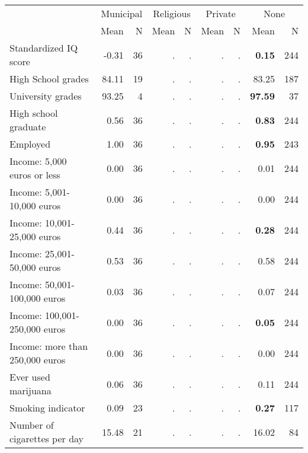 \begin{tabular}{l r r r r r r r r}
\toprule
& \multicolumn{2}{c}{Municipal} & \multicolumn{2}{c}{Religious} & \multicolumn{2}{c}{Private} & \multicolumn{2}{c}{None} \\
& \scriptsize Mean & \scriptsize N & \scriptsize Mean & \scriptsize N & \scriptsize Mean & \scriptsize N & \scriptsize Mean & \scriptsize N \\
\midrule
Standardized IQ score &     -0.31 &        36 &         . & . &         . & . & \textbf{     0.15} &       244 \\
High School grades &     84.11 &        19 &         . & . &         . & . &     83.25 &       187 \\
University grades &     93.25 &         4 &         . & . &         . & . & \textbf{    97.59} &        37 \\
High school graduate &      0.56 &        36 &         . & . &         . & . & \textbf{     0.83} &       244 \\
Employed &      1.00 &        36 &         . & . &         . & . & \textbf{     0.95} &       243 \\
Income: 5,000 euros or less &      0.00 &        36 &         . & . &         . & . &      0.01 &       244 \\
Income: 5,001-10,000 euros &      0.00 &        36 &         . & . &         . & . &      0.00 &       244 \\
Income: 10,001-25,000 euros &      0.44 &        36 &         . & . &         . & . & \textbf{     0.28} &       244 \\
Income: 25,001-50,000 euros &      0.53 &        36 &         . & . &         . & . &      0.58 &       244 \\
Income: 50,001-100,000 euros &      0.03 &        36 &         . & . &         . & . &      0.07 &       244 \\
Income: 100,001-250,000 euros &      0.00 &        36 &         . & . &         . & . & \textbf{     0.05} &       244 \\
Income: more than 250,000 euros &      0.00 &        36 &         . & . &         . & . &      0.00 &       244 \\
Ever used marijuana &      0.06 &        36 &         . & . &         . & . &      0.11 &       244 \\
Smoking indicator &      0.09 &        23 &         . & . &         . & . & \textbf{     0.27} &       117 \\
Number of cigarettes per day &     15.48 &        21 &         . & . &         . & . &     16.02 &        84 \\

\end{tabular}
